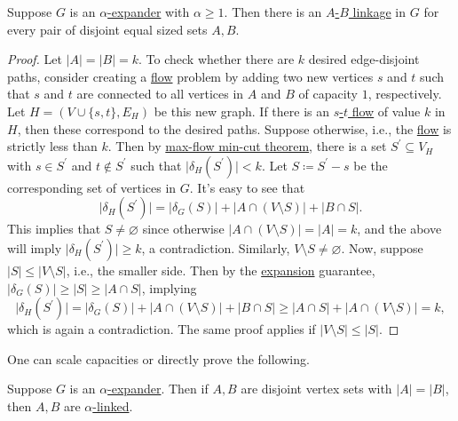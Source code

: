 \begin{lemma}\label{lma:expander-linkage}
	Suppose \(G\) is an \hyperref[def:expander]{\(\alpha \)-expander} with \(\alpha \geq 1\). Then there is an \hyperref[def:linkage]{\(A\)-\(B\) linkage} in \(G\) for every pair of disjoint equal sized sets \(A, B\).
\end{lemma}
\begin{proof}
	Let \(\lvert A \rvert = \lvert B \rvert = k\). To check whether there are \(k\) desired edge-disjoint paths, consider creating a \hyperref[prb:s-t-max-flow]{flow} problem by adding two new vertices \(s\) and \(t\) such that \(s\) and \(t\) are connected to all vertices in \(A\) and \(B\) of capacity \(1\), respectively. Let \(H = (V \cup \{ s, t \} , E_H)\) be this new graph. If there is an \hyperref[prb:s-t-max-flow]{\(s\)-\(t\) flow} of value \(k\) in \(H\), then these correspond to the desired paths. Suppose otherwise, i.e., the \hyperref[def:flow]{flow} is strictly less than \(k\). Then by \hyperref[thm:max-flow-min-cut]{max-flow min-cut theorem}, there is a set \(S^{\prime} \subseteq V_H\) with \(s \in S^{\prime} \) and \(t \notin S^{\prime} \) such that \(\lvert \delta _H(S^{\prime} ) \rvert < k\). Let \(S \coloneqq S^{\prime}  - s\) be the corresponding set of vertices in \(G\). It's easy to see that
	\[
		\lvert \delta _H(S^{\prime} ) \rvert
		= \lvert \delta _G(S) \rvert + \lvert A \cap (V\setminus S) \rvert + \lvert B \cap S \rvert.
	\]
	This implies that \(S \neq \varnothing \) since otherwise \(\lvert A \cap (V\setminus S) \rvert = \lvert A \rvert = k\), and the above will imply \(\lvert \delta _H(S^{\prime} ) \rvert \geq k\), a contradiction. Similarly, \(V\setminus S \neq \varnothing \). Now, suppose \(\lvert S \rvert \leq \lvert V\setminus S \rvert \), i.e., the smaller side. Then by the \hyperref[def:expansion]{expansion} guarantee, \(\lvert \delta _G(S) \rvert \geq \lvert S \rvert \geq \lvert A \cap S \rvert \), implying
	\[
		\lvert \delta _H(S^{\prime} ) \rvert
		= \lvert \delta _G(S) \rvert + \lvert A \cap (V\setminus S) \rvert + \lvert B \cap S \rvert
		\geq \lvert A \cap S \rvert + \lvert A \cap (V\setminus S) \rvert
		= k,
	\]
	which is again a contradiction. The same proof applies if \(\lvert V \setminus S \rvert \leq \lvert S \rvert \).
\end{proof}

One can scale capacities or directly prove the following.

\begin{corollary}\label{col:expander-linkage}
	Suppose \(G\) is an \hyperref[def:expander]{\(\alpha \)-expander}. Then if \(A, B\) are disjoint vertex sets with \(\lvert A \rvert = \lvert B \rvert \), then \(A, B\) are \hyperref[def:fractional-linkage]{\(\alpha \)-linked}.
\end{corollary}

